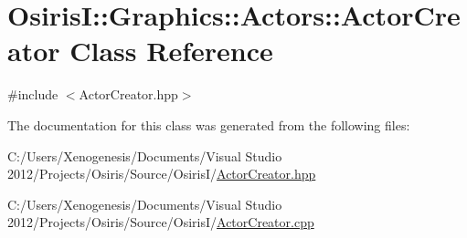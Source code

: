 \hypertarget{class_osiris_i_1_1_graphics_1_1_actors_1_1_actor_creator}{\section{Osiris\-I\-:\-:Graphics\-:\-:Actors\-:\-:Actor\-Creator Class Reference}
\label{class_osiris_i_1_1_graphics_1_1_actors_1_1_actor_creator}
}


{\ttfamily \#include $<$Actor\-Creator.\-hpp$>$}



The documentation for this class was generated from the following files\-:\begin{DoxyCompactItemize}
\item 
C\-:/\-Users/\-Xenogenesis/\-Documents/\-Visual Studio 2012/\-Projects/\-Osiris/\-Source/\-Osiris\-I/\hyperlink{_actor_creator_8hpp}{Actor\-Creator.\-hpp}\item 
C\-:/\-Users/\-Xenogenesis/\-Documents/\-Visual Studio 2012/\-Projects/\-Osiris/\-Source/\-Osiris\-I/\hyperlink{_actor_creator_8cpp}{Actor\-Creator.\-cpp}\end{DoxyCompactItemize}

